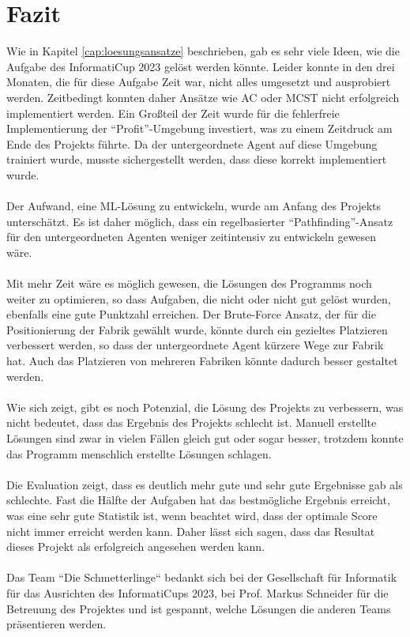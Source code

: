 \section{Fazit}\label{cap:fazit}
Wie in Kapitel \ref{cap:loesungsansatze} beschrieben, gab es sehr viele Ideen, wie die Aufgabe des InformatiCup 2023 gelöst werden könnte. Leider konnte in den drei Monaten, die für diese Aufgabe Zeit war, nicht alles umgesetzt und ausprobiert werden. Zeitbedingt konnten daher Ansätze wie AC oder MCST nicht erfolgreich implementiert werden. Ein Großteil der Zeit wurde für die fehlerfreie Implementierung der  “Profit”-Umgebung  investiert, was zu einem  Zeitdruck am Ende des Projekts führte. Da der untergeordnete Agent auf diese Umgebung trainiert wurde, musste sichergestellt werden, dass diese korrekt implementiert wurde.
\\\\
Der Aufwand, eine ML-Lösung zu entwickeln, wurde am Anfang des Projekts unterschätzt. Es ist daher möglich, dass ein regelbasierter “Pathfinding”-Ansatz für den untergeordneten Agenten weniger zeitintensiv zu entwickeln gewesen wäre.
\\\\
Mit mehr Zeit wäre es möglich gewesen, die Lösungen des Programms noch weiter zu optimieren, so dass Aufgaben, die nicht oder nicht gut gelöst wurden, ebenfalls eine gute Punktzahl erreichen. Der Brute-Force Ansatz, der für die Positionierung der Fabrik gewählt wurde, könnte durch ein gezieltes Platzieren verbessert werden, so dass der untergeordnete Agent kürzere Wege zur Fabrik hat. Auch das Platzieren von mehreren Fabriken könnte dadurch besser gestaltet werden.
\\\\
Wie sich zeigt, gibt es noch Potenzial, die Lösung des Projekts zu verbessern, was nicht bedeutet, dass das Ergebnis des Projekts schlecht ist. Manuell erstellte Lösungen sind zwar in vielen Fällen gleich gut oder sogar besser, trotzdem konnte das Programm menschlich erstellte Lösungen schlagen.
\\\\
Die Evaluation zeigt, dass es deutlich mehr gute und sehr gute Ergebnisse gab als schlechte. Fast die Hälfte der Aufgaben hat das bestmögliche Ergebnis erreicht, was eine sehr gute Statistik ist, wenn beachtet wird, dass der optimale Score nicht immer erreicht werden kann. Daher lässt sich sagen, dass das Resultat dieses Projekt als erfolgreich angesehen werden kann.
\\\\
Das Team “Die Schmetterlinge“ bedankt sich bei der Gesellschaft für Informatik für das Ausrichten des InformatiCups 2023, bei Prof. Markus Schneider für die Betreuung des Projektes und ist  gespannt, welche Lösungen die anderen Teams präsentieren werden.
